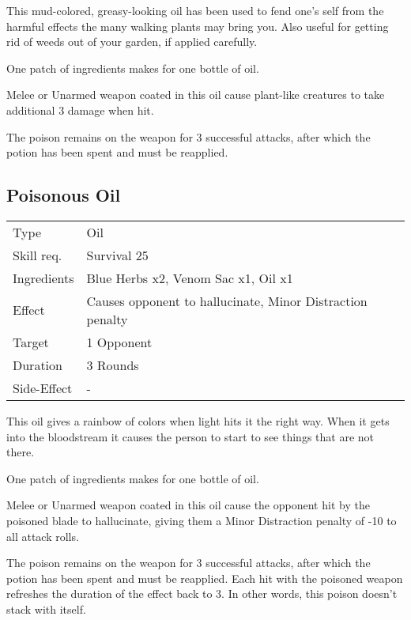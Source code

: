 \documentclass[11pt,a4paper,twocolumn]{book}
\begin{document}
\medskip

This mud-colored, greasy-looking oil has been used to fend one's self from the harmful effects the many walking plants may bring you. Also useful for getting rid of weeds out of your garden, if applied carefully.

One patch of ingredients makes for one bottle of oil.

Melee or Unarmed weapon coated in this oil cause plant-like creatures to take additional 3 damage when hit.

The poison remains on the weapon for 3 successful attacks, after which the potion has been spent and must be reapplied.
\vfill

\subsection*{Poisonous Oil}
{
	\begin{tabu} to 75mm{| X[l,4] | X[l,8] |}
		\hline
		Type 			& Oil 															\\
		Skill req.	    & Survival 25 													\\
		Ingredients     & Blue Herbs x2, Venom Sac x1, Oil x1							\\
		Effect     		& Causes opponent to hallucinate, Minor Distraction penalty 	\\
		Target      	& 1 Opponent													\\
		Duration  		& 3 Rounds	 													\\
		Side-Effect     & -																\\ \hline
	\end{tabu}
	
}

\medskip

This oil gives a rainbow of colors when light hits it the right way. When it gets into the bloodstream it causes the person to start to see things that are not there.

One patch of ingredients makes for one bottle of oil.

Melee or Unarmed weapon coated in this oil cause the opponent hit by the poisoned blade to hallucinate, giving them a Minor Distraction penalty of -10 to all attack rolls.

The poison remains on the weapon for 3 successful attacks, after which the potion has been spent and must be reapplied. Each hit with the poisoned weapon refreshes the duration of the effect back to 3. In other words, this poison doesn't stack with itself.
\end{document}
